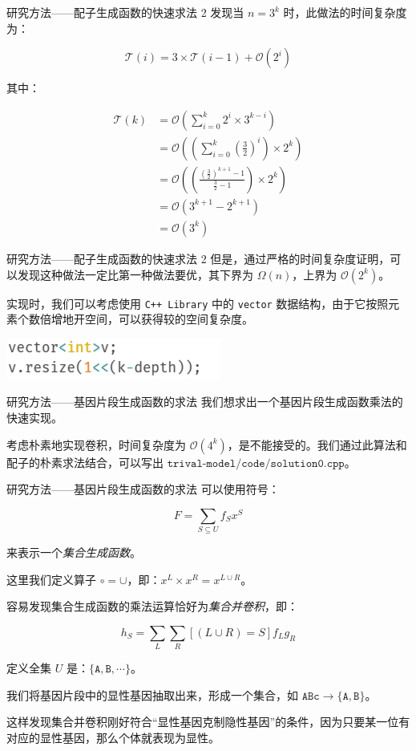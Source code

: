 \documentclass{beamer}
\begin{document}
	\begin{frame}{研究方法——配子生成函数的快速求法 2}
		发现当 $n=3^k$ 时，此做法的时间复杂度为：
		
		$$\mathcal T(i)=3 \times \mathcal T(i-1) + \mathcal O(2^i)$$
		
		其中：
		
		$$
		\begin{aligned}
			\mathcal T(k) &= \mathcal O\left(\sum_{i=0}^k 2^i \times 3^{k-i} \right) \\
			&= \mathcal O\left( \left (\sum_{i=0}^k (\frac{3}{2})^i \right) \times 2^k \right) \\
			&= \mathcal O\left( \left(\frac{\left(\frac{3}{2}\right)^{k+1}-1}{\frac{3}{2}-1}\right) \times 2^k\right) \\
			&= \mathcal O(3^{k+1} - 2^{k+1}) \\
			&= \mathcal O(3^k)
		\end{aligned}
		$$
	\end{frame}


	\begin{frame}{研究方法——配子生成函数的快速求法 2}
		但是，通过严格的时间复杂度证明，可以发现这种做法一定比第一种做法要优，其下界为 $\Omega(n)$，上界为 $\mathcal O(2^k)$。
		
		实现时，我们可以考虑使用 \texttt{C++ Library} 中的 \texttt{vector} 数据结构，由于它按照元素个数倍增地开空间，可以获得较的空间复杂度。
		
		\centering \includegraphics[scale=1]{vector.png}
	\end{frame}

	\begin{frame}{研究方法——基因片段生成函数的求法}
		我们想求出一个基因片段生成函数乘法的快速实现。
		
		考虑朴素地实现卷积，时间复杂度为 $\mathcal O(4^k)$，是不能接受的。我们通过此算法和配子的朴素求法结合，可以写出 $\texttt{trival-model/code/solution0.cpp}$。
		
	\end{frame}

	\begin{frame}{研究方法——基因片段生成函数的求法}
		可以使用符号：
		
		$$F=\sum_{S \subseteq U} f_S x^S$$
		
		来表示一个\textsl{集合生成函数}。
		
		这里我们定义算子 $\circ=\cup$，即：$x^L \times x^R=x^{L \cup R}$。
		
		容易发现集合生成函数的乘法运算恰好为\textsl{集合并卷积}，即：
		
		$$h_S =\sum_{L} \sum_{R} [(L \cup R) = S] f_L g_R$$
		
		定义全集 $U$ 是：$\{\texttt{A},\texttt{B},\cdots\}$。
		
		我们将基因片段中的显性基因抽取出来，形成一个集合，如 $\texttt{ABc} \to \{\texttt{A},\texttt{B}\}$。
		
		这样发现集合并卷积刚好符合“显性基因克制隐性基因”的条件，因为只要某一位有对应的显性基因，那么个体就表现为显性。
	\end{frame}
\end{document}

